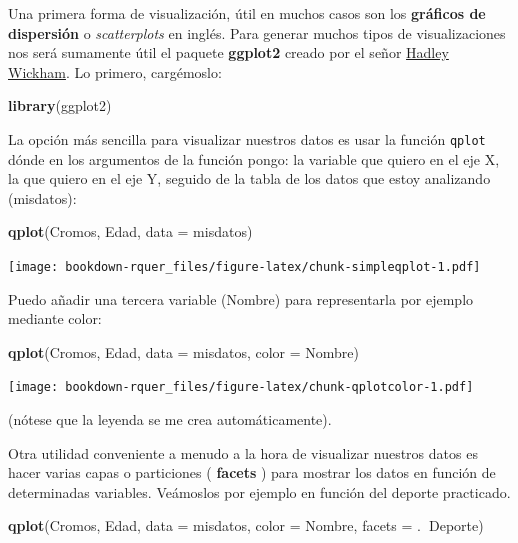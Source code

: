 \documentclass[]{book}
\newenvironment{Shaded}{\begin{snugshade}}{\end{snugshade}}
\newcommand{\DataTypeTok}[1]{\textcolor[rgb]{0.13,0.29,0.53}{#1}}
\newcommand{\KeywordTok}[1]{\textcolor[rgb]{0.13,0.29,0.53}{\textbf{#1}}}
\newcommand{\NormalTok}[1]{#1}
\newcommand{\OperatorTok}[1]{\textcolor[rgb]{0.81,0.36,0.00}{\textbf{#1}}}
\theoremstyle{definition}
\theoremstyle{definition}
\theoremstyle{definition}
\theoremstyle{remark}
\begin{document}
Una primera forma de visualización, útil en muchos casos son los
\textbf{gráficos de dispersión} o \emph{scatterplots} en inglés. Para
generar muchos tipos de visualizaciones nos será sumamente útil el
paquete \textbf{ggplot2} \citep{R-ggplot2} creado por el señor
\href{http://hadley.nz/}{Hadley Wickham}. Lo primero, cargémoslo:

\begin{Shaded}
\begin{Highlighting}[]
\KeywordTok{library}\NormalTok{(ggplot2) }
\end{Highlighting}
\end{Shaded}

La opción más sencilla para visualizar nuestros datos es usar la función
\texttt{qplot} dónde en los argumentos de la función pongo: la variable
que quiero en el eje X, la que quiero en el eje Y, seguido de la tabla
de los datos que estoy analizando (misdatos):

\begin{Shaded}
\begin{Highlighting}[]
\KeywordTok{qplot}\NormalTok{(Cromos, Edad, }\DataTypeTok{data =}\NormalTok{ misdatos)}
\end{Highlighting}
\end{Shaded}

\texttt{[image: bookdown-rquer\_files/figure-latex/chunk-simpleqplot-1.pdf]}

Puedo añadir una tercera variable (Nombre) para representarla por
ejemplo mediante color:

\begin{Shaded}
\begin{Highlighting}[]
\KeywordTok{qplot}\NormalTok{(Cromos, Edad, }\DataTypeTok{data =}\NormalTok{ misdatos, }\DataTypeTok{color =}\NormalTok{ Nombre)}
\end{Highlighting}
\end{Shaded}

\texttt{[image: bookdown-rquer\_files/figure-latex/chunk-qplotcolor-1.pdf]}

(nótese que la leyenda se me crea automáticamente).

Otra utilidad conveniente a menudo a la hora de visualizar nuestros
datos es hacer varias capas o particiones ( \textbf{facets} ) para
mostrar los datos en función de determinadas variables. Veámoslos por
ejemplo en función del deporte practicado.

\begin{Shaded}
\begin{Highlighting}[]
\KeywordTok{qplot}\NormalTok{(Cromos, Edad, }\DataTypeTok{data =}\NormalTok{ misdatos, }\DataTypeTok{color =}\NormalTok{ Nombre, }\DataTypeTok{facets =}\NormalTok{ .}\OperatorTok{~}\NormalTok{Deporte)}
\end{Highlighting}
\end{Shaded}
\end{document}
